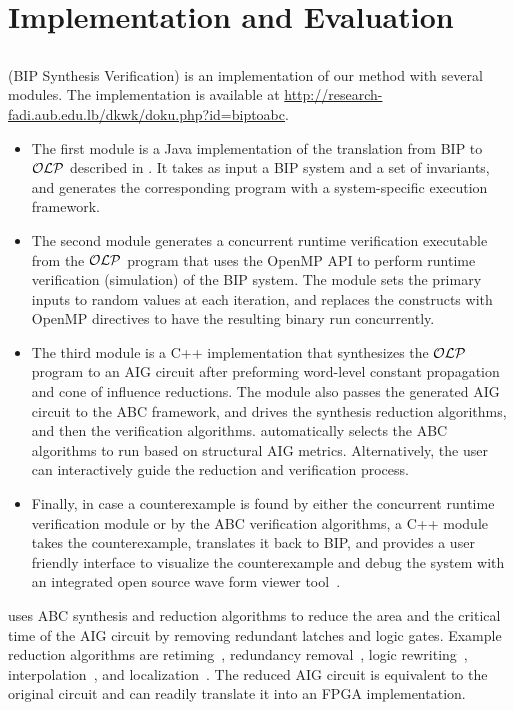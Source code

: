 \section{Implementation and Evaluation}
\label{sec:implem}
%
\subsection{\biptool{}}
\label{chap:implementation:bip}
%
\biptool{} (BIP Synthesis Verification) is an implementation of our method with several modules. 
The implementation is available at 
\href{http://research-fadi.aub.edu.lb/dkwk/doku.php?id=biptoabc}{http://research-fadi.aub.edu.lb/dkwk/doku.php?id=biptoabc}. 
%
\begin{itemize}
  \item
  The first module is a Java implementation of the translation from BIP to $\mathcal{OLP}$ described in .
It takes as input a BIP system and a set of invariants,
and generates the corresponding \caig{} program with a system-specific execution framework. 
%
\item
The second module generates a concurrent runtime verification 
  executable from the $\mathcal{OLP}$ 
  program that uses the OpenMP API to perform runtime 
  verification (simulation) of the BIP system. 
  The module sets the primary inputs to random values at each iteration,
  and replaces the  constructs with OpenMP directives
  to have the resulting binary run concurrently. 
%
  \item
  The third module is a C++ implementation that synthesizes the $\mathcal{OLP}$ program to an AIG circuit after preforming word-level constant propagation and cone of influence reductions. 
    The module also passes the generated AIG circuit to the ABC framework, and drives the synthesis reduction algorithms, and then the verification algorithms.
    \biptool{} automatically selects the ABC algorithms to run based on structural
    AIG metrics. Alternatively, the user can 
    interactively guide the reduction and verification process. 
%
\item Finally, in case a counterexample is found by either the 
concurrent runtime verification module or by the ABC verification algorithms, 
a C++ module takes the counterexample, 
translates it back to BIP, and provides a user friendly interface 
to visualize the counterexample and debug the system with an integrated open source wave form viewer tool~\cite{bybell2010gtkwave}.  
\end{itemize}
%
\biptool{} uses ABC synthesis and reduction algorithms to reduce the area 
and the critical time of the AIG circuit by 
removing redundant latches and logic gates.
Example reduction algorithms are
retiming~\cite{KuBa01}, 
redundancy removal~\cite{HmBPK05,KuMP01,BjesseC00,aziz-fmsd-00}, 
logic rewriting~\cite{BjBo04}, interpolation~\cite{McMillan03}, 
and localization~\cite{Wang03}. 
%
The reduced AIG circuit is equivalent to the original circuit and \biptool{}
can readily translate it into an FPGA implementation. 

